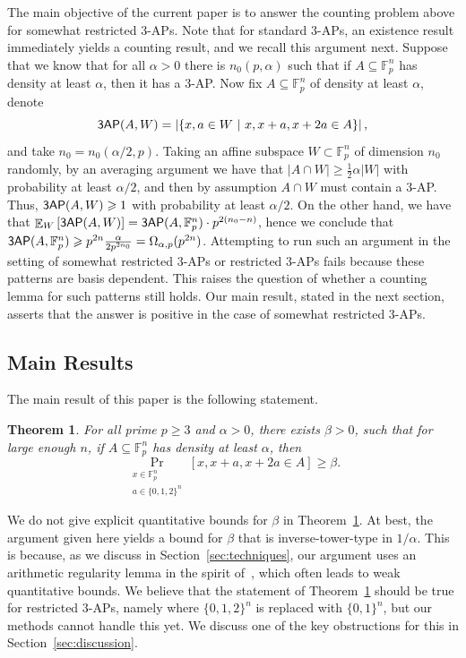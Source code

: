 \documentclass[10pt,a4paper]{amsart}
\newtheorem{thm}{Theorem}[section]
\newcommand\card[1]{\left| {#1} \right|}
\newcommand\Prob[2]{{\Pr_{#1}\left[ {#2} \right]}}
\newcommand\Expect[2]{{\mathop{\mathbb{E}}_{#1}\left[ {#2} \right]}}
\renewcommand\geq{\geqslant}
\begin{document}
The main objective of the current paper is to answer the counting problem above for somewhat restricted $3$-APs. Note that for standard $3$-APs, an existence result immediately yields a counting result, and we recall this argument next. Suppose that we know that for all $\alpha>0$ there is $n_0(p,\alpha)$ such that if $A\subseteq \mathbb{F}_p^n$ has density at least $\alpha$, then it has a $3$-AP. Now fix $A\subseteq \mathbb{F}_p^n$ of density at least $\alpha$, denote
\[
{\sf 3AP}(A,W) =
\card{\{x,a\in W~|~x,x+a,x+2a\in A\}},
\]
and take $n_0 = n_0(\alpha/2,p)$. Taking an affine subspace $W\subset\mathbb{F}_p^n$ of dimension $n_0$ randomly, by an averaging argument we have that $\card{A\cap W}\geq \frac{1}{2}\alpha \card{W}$ with probability at least $\alpha/2$, and then by assumption $A\cap W$ must contain a $3$-AP. Thus, 
${\sf 3AP}(A,W)\geq 1$ with probability at least $\alpha/2$. On the other hand, we have that $\Expect{W}{{\sf 3AP}(A,W)}= {\sf 3AP}(A,\mathbb{F}_p^n)\cdot p^{2(n_0-n)}$, hence we conclude that ${\sf 3AP}(A,\mathbb{F}_p^n)\geq p^{2n}\frac{\alpha}{2p^{2n_0}}=\Omega_{\alpha,p}(p^{2n})$.
Attempting to run such an argument in the setting of somewhat restricted $3$-APs or restricted $3$-APs fails because these patterns are basis dependent. This raises the question of whether a counting lemma for such patterns still holds. Our main result, stated in the next section, asserts that the answer is positive in the case of somewhat restricted $3$-APs.

\subsection{Main Results}
The main result of this paper is the following statement.
\begin{thm}\label{thm:main}
    For all prime $p\geq 3$ and $\alpha>0$, there exists $\beta>0$, such that for large enough $n$, if $A\subseteq \mathbb{F}_p^n$ has density at least $\alpha$, then
    \[
    \Prob{\substack{x\in \mathbb{F}_p^n\\ a\in \{0,1,2\}^n}}{x,x+a,x+2a\in A}\geq \beta.
    \]
\end{thm}
We do not give explicit quantitative bounds for $\beta$ in Theorem~\ref{thm:main}. 
At best, the argument given here yields a bound for $\beta$ that is inverse-tower-type in $1/\alpha$. 
This is because, as we discuss in Section~\ref{sec:techniques}, our argument uses an arithmetic regularity lemma in the spirit of~\cite{Green2005SzemerediRegularityAbelianGroups,GreenTao2010ArithmeticRegularity}, which often leads to weak quantitative bounds.
We believe that the statement of Theorem~\ref{thm:main} should be true for restricted $3$-APs, namely where $\{0,1,2\}^n$ is replaced with $\{0,1\}^n$, but our methods cannot handle this yet. We discuss one of the key obstructions for this in Section~\ref{sec:discussion}.
\end{document}
